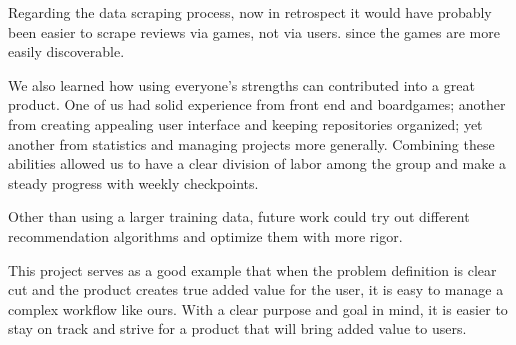 \documentclass[a4paper,12pt,bibliography=totoc,numbers=noenddot,sfdefaults=false,abstract=true,notitlepage]{scrartcl} %
\begin{document}
    Regarding the data scraping process, now in retrospect it would have probably been easier to scrape reviews via games, not via users. since the games are more easily
    discoverable.
	
	We also learned how using everyone's strengths can contributed into a great product. One of us had solid experience from front end and boardgames; another from creating appealing user interface and keeping repositories organized; yet another from statistics and managing projects more generally. Combining these abilities allowed us to have a clear division of labor among the group and make a steady progress with weekly checkpoints.
	
	
	Other than using a larger training data, future work could try out different recommendation algorithms and optimize them with more rigor.
	
	This project serves as a good example that when the problem definition is clear cut and the product creates true added value for the user, it is easy to manage a complex workflow like ours. With a clear purpose and goal in mind, it is easier to stay on track and strive for a product that will bring added value to users.
	
	\FloatBarrier
	\printbibliography
	
	
	
	

	
	
	\clearpage
	\setcounter{secnumdepth}{3} %
	\appendix %
	
\end{document}
